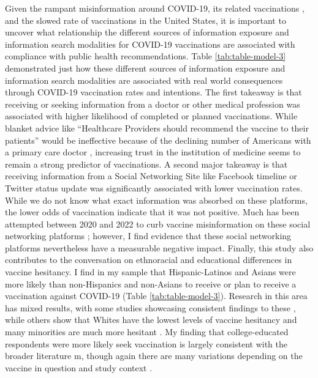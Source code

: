 Given the rampant misinformation around COVID-19, its related vaccinations
\citep{pathakInfodemicsCOVID19Role2020, mottaHowRightLeaningMedia2020, shahsavariConspiracyTimeCorona2020},
and the slowed rate of vaccinations in the
United States, it is important to uncover what relationship the different
sources of information exposure and information search modalities for COVID-19 vaccinations
are associated with compliance with public health recommendations. Table
\ref{tab:table-model-3} demonstrated just how these different sources of information 
exposure and information search modalities are associated with real world
consequences through COVID-19 vaccination rates and intentions. The first
takeaway is that receiving or seeking information from a doctor or other medical
profession was associated with higher likelihood of completed or planned vaccinations.
While blanket advice like ``Healthcare Providers should recommend the vaccine to
their patients'' would be ineffective because of the declining number of
Americans with a primary care doctor \citep{levine_etal20}, increasing trust in the
institution of medicine seems to remain a strong predictor of vaccinations.
A second major takeaway is that receiving information from a Social Networking
Site like Facebook timeline or Twitter status update was significantly
associated with lower vaccination rates. While we do not know what exact
information was absorbed on these platforms, the lower odds of vaccination
indicate that it was not positive. Much has been attempted between 2020 and 2022
to curb vaccine misinformation on these social networking platforms 
\citep[see][for an early example]{bowman20}; however, I find evidence that these social
networking platforms nevertheless have a measurable negative impact. Finally,
this study also contributes to the conversation on ethnoracial and
educational differences in vaccine hesitancy. I find in my sample that
Hispanic-Latinos and Asians were more likely than non-Hispanics and non-Asians
to receive or plan to receive a vaccination against COVID-19 (Table
\ref{tab:table-model-3}). Research in this area has mixed results, with some
studies showcasing consistent findings to these \citep{bagasra_etal21,king_etal21},
while others show that Whites have the lowest levels of vaccine hesitancy and
many minorities are much more hesitant \citep{momplaisir_etal21, foxworth21}. 
My finding that college-educated respondents were more likely seek vaccination is 
largely consistent with the broader literature m\citep{khairat_etal22}, though 
again there are many variations depending on the vaccine
in question and study context \citep{siddiqui_etal13}.

